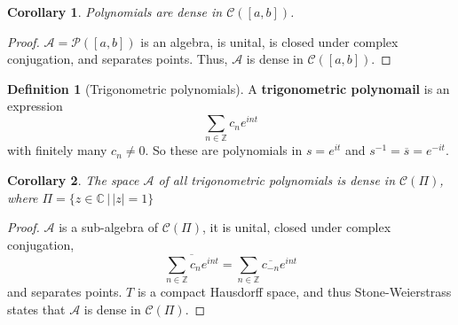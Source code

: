 \documentclass[10pt, oneside, reqno]{amsbook}
\theoremstyle{plain}%
\newtheorem*{cor}{Corollary}
\theoremstyle{definition}
\newtheorem{defn}[thm]{Definition}
\theoremstyle{remark}
\newcommand{\Com}{\mathbb{C}}
\newcommand{\Z}{\mathbb{Z}}
\begin{document}


\begin{cor}
    Polynomials are dense in $\mathcal C([a,b])$.  
\end{cor}
\begin{proof}
    $\mathcal A = \mathcal P([a,b])$ is an algebra, is unital, is closed under complex conjugation, and separates points.  Thus, $\mathcal A$ is dense in $\mathcal C([a,b])$.
\end{proof}

\begin{defn}[Trigonometric polynomials]
    A \textbf{trigonometric polynomail} is an expression \[
        \sum_{ n \in \Z} c_n e^{i n t}
    \] with finitely many $c_n \neq 0$. So these are polynomials in $s = e^{it}$ and $s^{-1} = \overline s = e^{-it}$.
\end{defn}

\begin{cor}
    The space $\mathcal A$ of all trigonometric polynomials is dense in $\mathcal C(\Pi)$, where $\Pi = \{ z \in \Com \, | \, |z | = 1 \}$
\end{cor}
\begin{proof}
    $\mathcal A$ is a sub-algebra of $\mathcal C(\Pi)$, it is unital, closed under complex conjugation, \[
        \overline{\sum_{n \in \Z} c_n e^{int}} = \sum_{n \in \Z} \overline{c_{-n}} e^{int}
    \] and separates points.  $T$ is a compact Hausdorff space, and thus Stone-Weierstrass states that $\mathcal{A}$ is dense in $\mathcal C(\Pi)$.  
\end{proof}
\end{document}
